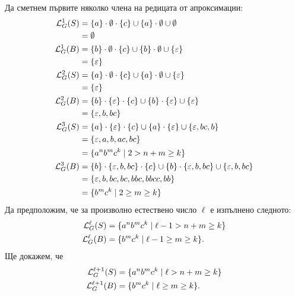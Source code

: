 {\begin{example}
  Да сметнем първите няколко члена на редицата от апроксимации:
  \begin{align*}    
    \mathcal{L}^1_G(S) & = \{a\} \cdot \emptyset \cdot \{c\} \cup \{a\}\cdot\emptyset \cup \emptyset \\
              & = \emptyset\\
    \mathcal{L}^1_G(B) & = \{b\} \cdot \emptyset \cdot \{c\} \cup \{b\} \cdot \emptyset \cup \{\varepsilon\} \\
              & = \{\varepsilon\}\\
    \mathcal{L}^2_G(S) & = \{a\} \cdot \emptyset \cdot \{c\} \cup \{a\}\cdot\emptyset \cup \{\varepsilon\} \\
              & = \{\varepsilon\}\\
    \mathcal{L}^2_G(B) & = \{b\} \cdot \{\varepsilon\} \cdot \{c\} \cup \{b\}\cdot \{\varepsilon\} \cup \{\varepsilon\} \\
              & = \{\varepsilon,b,bc\}\\
    \mathcal{L}^3_G(S) & = \{a\} \cdot \{\varepsilon\} \cdot \{c\} \cup \{a\}\cdot\{\varepsilon\} \cup \{\varepsilon,bc,b\} \\
              & = \{\varepsilon, a, b, ac, bc\}\\
              & = \{a^nb^mc^k \mid 2 > n+m \geq k\}\\
    \mathcal{L}^3_G(B) & = \{b\} \cdot \{\varepsilon,b,bc\} \cdot \{c\} \cup \{b\}\cdot \{\varepsilon,b,bc\} \cup \{\varepsilon,b,bc\} \\
              & = \{\varepsilon,b,bc,bc,bbc,bbcc,bb\}\\
              & = \{ b^mc^k \mid 2 \geq m \geq k\}
  \end{align*}
  Да предположим, че за произволно естествено число $\ell$ е изпълнено следното:
  \begin{align*}
    \mathcal{L}^\ell_G(S) & = \{a^nb^mc^k \mid \ell - 1 > n+m \geq k\}\\
    \mathcal{L}^\ell_G(B)  & = \{ b^mc^k \mid \ell -1 \geq m \geq k\}.
  \end{align*}
  Ще докажем, че
  \begin{align*}
    \mathcal{L}^{\ell+1}_G(S) & = \{a^nb^mc^k \mid \ell > n+m \geq k\}\\
    \mathcal{L}^{\ell+1}_G(B)  & = \{ b^mc^k \mid \ell \geq m \geq k\}.
  \end{align*}


\end{example}}

